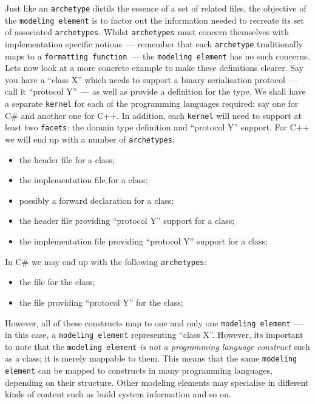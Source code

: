 \documentclass{book}
\begin{document}
Just like an \texttt{archetype} distils the essence of a set of
related files, the objective of the \texttt{modeling element} is to
factor out the information needed to recreate its set of associated
\texttt{archetypes}. Whilst \texttt{archetypes} must concern
themselves with implementation specific notions~--- remember that each
\texttt{archetype} traditionally maps to a \texttt{formatting
  function}~--- the \texttt{modeling element} has no such
concerns. Lets now look at a more concrete example to make these
definitions clearer. Say you have a ``class X'' which needs to support
a binary serialisation protocol~--- call it ``protocol Y''~--- as well
as provide a definition for the type. We shall have a separate
\texttt{kernel} for each of the programming languages required: say
one for C\# and another one for C++. In addition, each \texttt{kernel}
will need to support at least two \texttt{facets}: the domain type
definition and ``protocol Y'' support. For C++ we will end up with a
number of \texttt{archetypes}:

\begin{itemize}
\item the header file for a class;
\item the implementation file for a class;
\item possibly a forward declaration for a class;
\item the header file providing ``protocol Y'' support for a class;
\item the implementation file providing ``protocol Y'' support for a class;
\end{itemize}

In C\# we may end up with the following \texttt{archetypes}:

\begin{itemize}
\item the file for the class;
\item the file providing ``protocol Y'' for the class;
\end{itemize}

However, all of these constructs map to one and only one
\texttt{modeling element}~--- in this case, a \texttt{modeling
  element} representing ``class X''. However, its important to note
that the \texttt{modeling element} \emph{is not a programming language
  construct} such as a class; it is merely mappable to them. This
means that the same \texttt{modeling element} can be mapped to
constructs in many programming languages, depending on their
structure. Other modeling elements may specialise in different kinds
of content such as build system information and so on.
\end{document}
